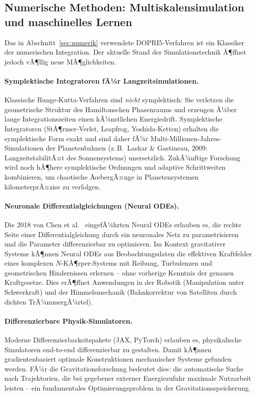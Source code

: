 ﻿\documentclass[12pt, a4paper]{report}
\theoremstyle{definition}
\theoremstyle{remark}
\begin{document}
\subsection{Numerische Methoden: Multiskalensimulation und maschinelles
               Lernen}

Das in Abschnitt~\ref{sec:numerik} verwendete DOPRI5-Verfahren ist ein
Klassiker der numerischen Integration. Der aktuelle Stand der Simulationstechnik
Ã¶ffnet jedoch vÃ¶llig neue MÃ¶glichkeiten.

\paragraph{Symplektische Integratoren fÃ¼r Langzeitsimulationen.}
Klassische Runge-Kutta-Verfahren sind \emph{nicht} symplektisch: Sie verletzen
die geometrische Struktur des Hamiltonschen Phasenraums und erzeugen Ã¼ber lange
Integrationszeiten einen kÃ¼nstlichen Energiedrift. Symplektische Integratoren
(StÃ¶rmer-Verlet, Leapfrog, Yoshida-Ketten) erhalten die symplektische Form exakt
und sind daher fÃ¼r Multi-Millionen-Jahres-Simulationen der Planetenbahnen (z.\,B.\
Laskar \& Gastineau, 2009: LangzeitstabilitÃ¤t des Sonnensystems) unersetzlich.
ZukÃ¼nftige Forschung wird noch hÃ¶here symplektische Ordnungen und adaptive
Schrittweiten kombinieren, um chaotische ÃœbergÃ¤nge in Planetensystemen
kilometerprÃ¤zise zu verfolgen.

\paragraph{Neuronale Differentialgleichungen (Neural ODEs).}
Die 2018 von Chen et al.~\cite{chen2018} eingefÃ¼hrten Neural ODEs erlauben es, die rechte Seite
einer Differentialgleichung durch ein neuronales Netz zu parametrisieren und die
Parameter differenzierbar zu optimieren. Im Kontext gravitativer Systeme kÃ¶nnen
Neural ODEs aus Beobachtungsdaten die effektiven Kraftfelder eines komplexen
$N$-KÃ¶rper-Systems mit Reibung, Turbulenzen und geometrischen Hindernissen erlernen
-- ohne vorherige Kenntnis der genauen Kraftgesetze. Dies erÃ¶ffnet Anwendungen in
der Robotik (Manipulation unter Schwerkraft) und der Himmelsmechanik (Bahnkorrektur
von Satelliten durch dichten TrÃ¼mmergÃ¼rtel).

\paragraph{Differenzierbare Physik-Simulatoren.}
Moderne Differenzierbarkeitspakete (JAX, PyTorch) erlauben es, physikalische
Simulatoren end-to-end differenzierbar zu gestalten. Damit kÃ¶nnen gradientenbasiert
optimale Konstruktionen mechanischer Systeme gefunden werden. FÃ¼r die
Gravitationsforschung bedeutet dies: die automatische Suche nach Trajektorien,
die bei gegebener externer Energiezufuhr maximale Nutzarbeit leisten -- ein
fundamentales Optimierungsproblem in der Gravitationsspeicherung.
\end{document}
